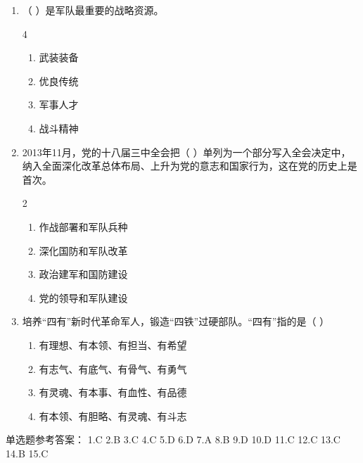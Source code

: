 \documentclass[a4paper,11pt]{ctexart}
\begin{document}
\begin{enumerate}
    \item （ ）是军队最重要的战略资源。
    \begin{multicols}{4}
    \begin{enumerate}
        \item 武装装备
        \item 优良传统
        \item 军事人才
        \item 战斗精神
    \end{enumerate}
    \end{multicols}

    \item 2013年11月，党的十八届三中全会把（ ）单列为一个部分写入全会决定中，纳入全面深化改革总体布局、上升为党的意志和国家行为，这在党的历史上是首次。
    \begin{multicols}{2}
    \begin{enumerate}
        \item 作战部署和军队兵种
        \item 深化国防和军队改革
        \item 政治建军和国防建设
        \item 党的领导和军队建设
    \end{enumerate}
    \end{multicols}

    \item 培养“四有”新时代革命军人，锻造“四铁”过硬部队。“四有”指的是（ ）
    \begin{enumerate}
        \item 有理想、有本领、有担当、有希望
        \item 有志气、有底气、有骨气、有勇气
        \item 有灵魂、有本事、有血性、有品德
        \item 有本领、有胆略、有灵魂、有斗志
    \end{enumerate}
\end{enumerate}

\begin{answerbox}
单选题参考答案：
1.C \quad 2.B \quad 3.C \quad 4.C \quad 5.D \quad 6.D \quad 7.A \quad 8.B \quad 9.D \quad 10.D \quad 11.C \quad 12.C \quad 13.C \quad 14.B \quad 15.C
\end{answerbox}
\end{document}
